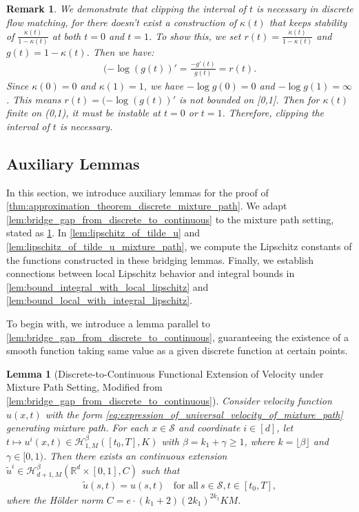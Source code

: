\documentclass[12pt]{article}
\numberwithin{equation}{section}
\let\tilde\widetilde
\newcommand{\wt}{\widetilde}
\renewcommand{\tilde}{\wt}
\def\R{\mathbb{R}}
\theoremstyle{theoremstyle}
\newtheorem{lemma}{Lemma}[section]
\newtheorem{remark}{Remark}[section]
\numberwithin{equation}{section}
\numberwithin{theorem}{section}
\numberwithin{proposition}{section}
\numberwithin{definition}{section}
\numberwithin{lemma}{section}
\numberwithin{assumption}{section}
\numberwithin{remark}{section}
\begin{document}
\begin{remark}
We demonstrate that clipping the interval of $t$ is necessary in discrete flow matching, for there doesn't exist a construction of $\kappa(t)$ that keeps stability of $\frac{\dot{\kappa}(t)}{1-\kappa(t)}$ at both $t=0$ and $t=1$.
To show this, we set $r(t)=\frac{\dot{\kappa}(t)}{1-\kappa(t)}$ and $g(t)=1-\kappa(t)$.
Then we have:
\begin{align*}
    (-\log(g(t))'=\frac{-g'(t)}{g(t)}=r(t).
\end{align*}
Since $\kappa(0)=0$ and $\kappa(1)=1$, we have $-\log g(0)=0$ and $-\log g(1)=\infty$.
This means $r(t)=(-\log(g(t))'$ is not bounded on [0,1].
Then for $\kappa(t)$ finite on (0,1), it must be instable at 
$t=0$ or $t=1$.
Therefore, clipping the interval of $t$ is necessary.

\end{remark}

\subsection{Auxiliary Lemmas}
\label{subsec:auxiliary_lemma_approximation_mixture_path}

In this section, we introduce auxiliary lemmas for the proof of \cref{thm:approximation_theorem_discrete_mixture_path}.
We adapt \cref{lem:bridge_gap_from_discrete_to_continuous} to the mixture path setting, stated as \cref{lem:bridge_gap_from_discrete_to_continuous_mixture_path}.
In \cref{lem:lipschitz_of_tilde_u} and \cref{lem:lipschitz_of_tilde_u_mixture_path}, we compute the Lipschitz constants of the functions constructed in these bridging lemmas.
Finally, we establish connections between local Lipschitz behavior and integral bounds in \cref{lem:bound_integral_with_local_lipschitz} and \cref{lem:bound_local_with_integral_lipschitz}.

To begin with, we introduce a lemma parallel to \cref{lem:bridge_gap_from_discrete_to_continuous}, guaranteeing the existence of a smooth function taking same value as a given discrete function at certain points.

\begin{lemma}[Discrete-to-Continuous Functional Extension of Velocity under Mixture Path Setting, Modified from \cref{lem:bridge_gap_from_discrete_to_continuous}]
\label{lem:bridge_gap_from_discrete_to_continuous_mixture_path}
Consider velocity function $u(x,t)$ with the form \eqref{eq:expression_of_universal_velocity_of_mixture_path} generating mixture path.
For each $x\in\mathcal{S}$ and coordinate $i \in [d]$, 
let $t \mapsto u^i(x,t) \in \mathcal{H}^\beta_{1,M}([t_0,T],K)$ with $\beta=k_1+\gamma\ge 1$, where  $k=\lfloor \beta \rfloor$ and $\gamma\in[0,1)$.  
Then there exists an continuous extension $\tilde{u}^i \in \mathcal{H}^{\beta}_{d+1,M}(\R^{d}\times[0,1],C)$  such that
\begin{align*}
    \tilde{u}(s,t)=u(s,t) ~~~~\text{for all}~ s\in\mathcal{S}, t\in[t_0,T],
\end{align*}
where the H\"older norm $C = e\cdot(k_1+2)(2k_1)^{2k_1} KM$.
\end{lemma}
\end{document}
